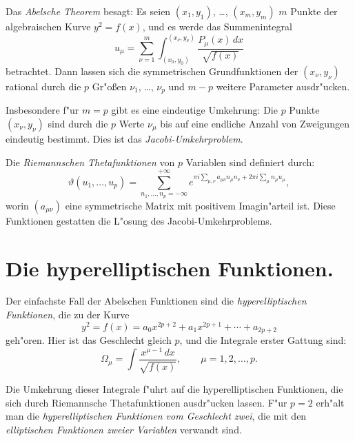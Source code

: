 \documentclass[12pt,a4paper]{article}
\theoremstyle{definition}
\begin{document}
Das \emph{Abelsche Theorem} besagt: Es seien $(x_1,y_1)$, \ldots, $(x_m,y_m)$ $m$ Punkte der algebraischen Kurve $y^2 = f(x)$, und es werde das Summenintegral
\begin{equation}\tag{2}
u_\mu = \sum_{\nu=1}^m \int_{(x_0,y_0)}^{(x_\nu,y_\nu)} \frac{P_\mu(x)\,dx}{\sqrt{f(x)}}
\end{equation}
betrachtet. Dann lassen sich die symmetrischen Grundfunktionen der $(x_\nu,y_\nu)$ rational durch die $p$ Gr"o\ss{}en $\nu_1$, \ldots, $\nu_p$ und $m-p$ weitere Parameter ausdr"ucken.

Insbesondere f"ur $m = p$ gibt es eine eindeutige Umkehrung: Die $p$ Punkte $(x_\nu,y_\nu)$ sind durch die $p$ Werte $\nu_\mu$ bis auf eine endliche Anzahl von Zweigungen eindeutig bestimmt. Dies ist das \emph{Jacobi-Umkehrproblem}.

Die \emph{Riemannschen Thetafunktionen} von $p$ Variablen sind definiert durch:
\begin{equation}\tag{3}
\vartheta(u_1,\ldots,u_p) = \sum_{n_1,\ldots,n_p=-\infty}^{+\infty} e^{\pi i\sum_{\mu,\nu} a_{\mu\nu}n_\mu n_\nu + 2\pi i\sum_\mu n_\mu u_\mu},
\end{equation}
worin $(a_{\mu\nu})$ eine symmetrische Matrix mit positivem Imagin"arteil ist. Diese Funktionen gestatten die L"osung des Jacobi-Umkehrproblems.

\newpage

\section{Die hyperelliptischen Funktionen.}

Der einfachste Fall der Abelschen Funktionen sind die \emph{hyperelliptischen Funktionen}, die zu der Kurve
\begin{equation}\tag{1}
y^2 = f(x) = a_0x^{2p+2} + a_1x^{2p+1} + \cdots + a_{2p+2}
\end{equation}
geh"oren. Hier ist das Geschlecht gleich $p$, und die Integrale erster Gattung sind:
\begin{equation}\tag{2}
\Omega_\mu = \int\frac{x^{\mu-1}\,dx}{\sqrt{f(x)}},\qquad \mu = 1,2,\ldots,p.
\end{equation}

Die Umkehrung dieser Integrale f"uhrt auf die hyperelliptischen Funktionen, die sich durch Riemannsche Thetafunktionen ausdr"ucken lassen. F"ur $p = 2$ erh"alt man die \emph{hyperelliptischen Funktionen vom Geschlecht zwei}, die mit den \emph{elliptischen Funktionen zweier Variablen} verwandt sind.
\end{document}
